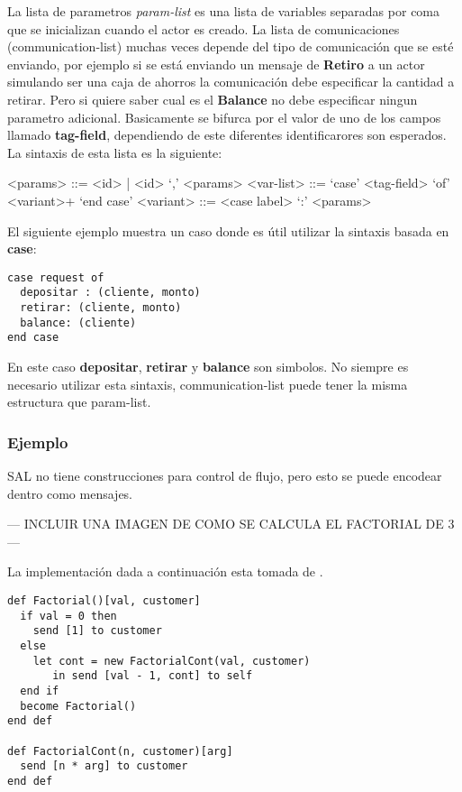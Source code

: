 \documentclass[fleqn]{article}
\begin{document}
La lista de parametros \textit{param-list} es una lista de variables separadas por coma
que se inicializan cuando el actor es creado. La lista de comunicaciones (communication-list)
muchas veces depende del tipo de comunicación que se esté enviando, por ejemplo
si se está enviando un mensaje de \textbf{Retiro} a un actor simulando ser una
caja de ahorros la comunicación debe especificar la cantidad a retirar. Pero si
quiere saber cual es el \textbf{Balance} no debe especificar ningun parametro
adicional.
Basicamente se bifurca por el valor de uno de los campos llamado
\textbf{tag-field}, dependiendo de este diferentes identificarores son esperados.
La sintaxis de esta lista es la siguiente:

\begin{grammar}
  <params> ::= <id> | <id> `,' <params>
  <var-list> ::= `case' <tag-field> `of' <variant>+ `end case'
  <variant> ::= <case label> `:' <params>
\end{grammar}

El siguiente ejemplo muestra un caso donde es útil utilizar la sintaxis basada
en \textbf{case}:

\begin{verbatim}
case request of 
  depositar : (cliente, monto) 
  retirar: (cliente, monto) 
  balance: (cliente) 
end case
\end{verbatim}

En este caso \textbf{depositar}, \textbf{retirar} y \textbf{balance} son
simbolos. 
No siempre es necesario utilizar esta sintaxis, communication-list puede tener
la misma estructura que param-list.

\subsubsection{Ejemplo}

SAL no tiene construcciones para control de flujo, pero esto se puede encodear
dentro como mensajes.

--- INCLUIR UNA IMAGEN DE COMO SE CALCULA EL FACTORIAL DE 3 ---

La implementación dada a continuación esta tomada de \cite{Agha:1986:AMC:7929}.


\begin{lstlisting}[language=sal]
def Factorial()[val, customer]
  if val = 0 then
    send [1] to customer
  else
    let cont = new FactorialCont(val, customer)
       in send [val - 1, cont] to self
  end if
  become Factorial()
end def

def FactorialCont(n, customer)[arg] 
  send [n * arg] to customer
end def
\end{lstlisting}
\end{document}
